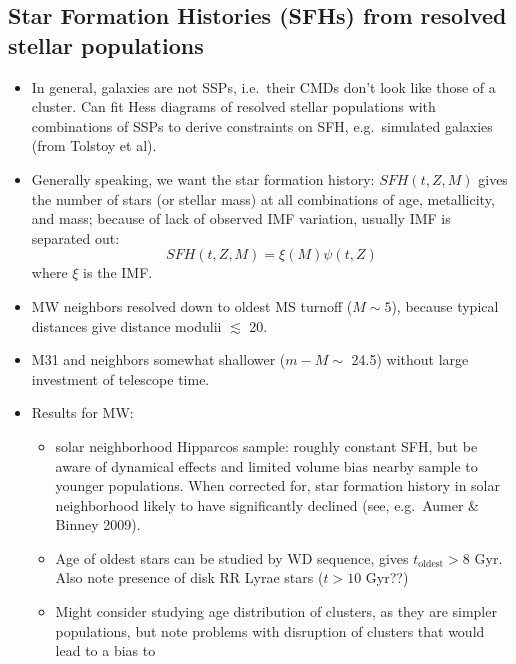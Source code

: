 \documentclass{article}
\begin{document}
\subsection{Star Formation Histories (SFHs) from resolved stellar populations}
      \begin{itemize}
          \item In general, galaxies are not SSPs, i.e.\ their CMDs don't look
              like those of a cluster. Can fit Hess diagrams of resolved stellar
              populations with combinations of SSPs to derive constraints on SFH,
              e.g.\ {simulated galaxies} (from
              {Tolstoy et al}).
          \item Generally speaking, we want the star formation history:
              $SFH(t,Z,M)$ gives the number of stars (or stellar mass) at all
              combinations of age, metallicity, and mass; because of lack of
              observed IMF variation, usually IMF is separated out:
              $$ SFH(t,Z,M) = \xi(M)\psi(t,Z) $$
              where $\xi$ is the IMF.
          \item MW neighbors resolved down to oldest MS turnoff ($M \sim 5$),
              because typical distances give distance modulii $\lesssim$ 20.
          \item M31 and neighbors somewhat shallower ($m-M\sim$ 24.5)
              without large investment of telescope time.
          \item Results for MW:
              \begin{itemize}
                  \item {solar neighborhood Hipparcos sample}:
                      roughly constant {SFH}, but be aware
                      of dynamical effects and limited volume bias nearby
                      sample to younger populations. When corrected for, star
                      formation history in solar neighborhood likely to have
                      significantly declined (see, e.g.\
                      {Aumer \& Binney 2009}).
                  \item Age of oldest stars can be studied by WD sequence,
                      gives $t_{\textrm{oldest}} > 8$ Gyr. Also note presence
                      of disk RR Lyrae stars ($t > 10$ Gyr??)
                  \item Might consider studying age distribution of clusters,
                      as they are simpler populations, but note problems with
                      disruption of clusters that would lead to a bias to

\end{itemize}
\end{itemize}
\end{document}
